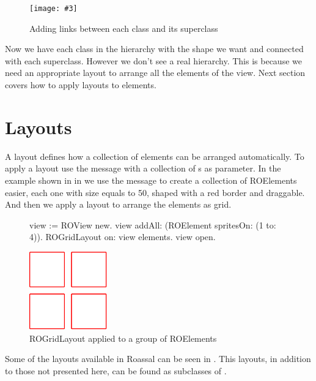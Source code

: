 \documentclass[a4paper,10pt,twoside]{book}
\newcommand{\fig}[4]{
		\begin{figure}[#1]
			\centering
			\texttt{[image: \#3]}
			\caption{\label{fig:#3}#4}
		\end{figure}}
\begin{document}
\fig{H}{0.6}{hier3}{Adding links between each class and its superclass}

Now we have each class in the  hierarchy with the shape we want and connected with each superclass. However we don't see a real hierarchy. This is because we need an appropriate layout to arrange all the elements of the view. Next section covers how to apply layouts to elements.


\section{Layouts} 
A layout defines how a collection of elements can be arranged automatically. To apply a layout use the  message with a collection of s as parameter. In the example shown in in  we use the  message to create a collection of ROElements easier, each one with size equals to 50, shaped with a red border and draggable. And then we apply a layout to arrange the elements as grid.


\begin{figure}[H]
\label{fig:primerLayout}
      \begin{minipage}[t]{0.55\textwidth}
      \vspace{0pt}
     \begin{code}{}
view := ROView new.
view addAll: (ROElement spritesOn: (1 to: 4)).
ROGridLayout on: view elements.
view open.
  \end{code}
   \end{minipage}
   \hfill
   \begin{minipage}[t]{0.6\textwidth}
      \vspace{0pt} \raggedright
       \centering
		\includegraphics[width=0.3\textwidth]{ROGrid2} %
   \end{minipage}

\caption{ROGridLayout applied to a group of ROElements}
\end{figure} 

Some of the layouts available in Roassal can be seen in . This layouts, in addition to those not presented here, can be found as subclasses of .
\end{document}
